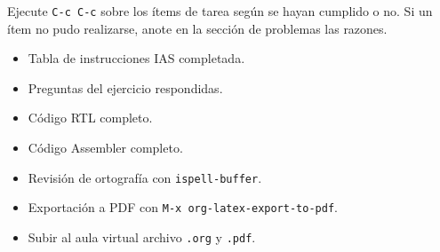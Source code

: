 \documentclass{article}
\begin{document}
Ejecute \texttt{C-c C-c} sobre los ítems de tarea según se hayan cumplido o
no. Si un ítem no pudo realizarse, anote en la sección de problemas
las razones.

\begin{itemize}
\item[{$\boxtimes$}] Tabla de instrucciones IAS completada.
\item[{$\boxtimes$}] Preguntas del ejercicio respondidas.
\item[{$\boxtimes$}] Código RTL completo.
\item[{$\boxtimes$}] Código Assembler completo.
\item[{$\boxtimes$}] Revisión de ortografía con \texttt{ispell-buffer}.
\item[{$\boxtimes$}] Exportación a PDF con \texttt{M-x org-latex-export-to-pdf}.
\item[{$\boxtimes$}] Subir al aula virtual archivo \texttt{.org} y \texttt{.pdf}.
\end{itemize}

\printbibliography
\end{document}
